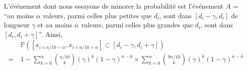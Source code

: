 \begin{itemize}[label=•]



    L'événement dont nous essayons de minorer la probabilité est l'événement \(A\) = ``au moins \(\alpha\) valeurs, parmi celles plus petites que \(d_i\), sont dans \([d_i - \gamma,d_i]\) de longueur \(\gamma\) et au moins \(\alpha\) valeurs, parmi celles plus grandes que \(d_i\), sont dans \([d_i, d_i + \gamma]\)''. Ainsi,
    \begin{align*}
        & \ \mathbb P \left([x_{i\times n/10 -\alpha},x_{i\times n/10 +\alpha}] \subset [d_i - \gamma, d_i + \gamma] \right)\\
        = &\ 1 - \sum_{k = 0}^{\alpha} \binom{n/10}{k}\left( \gamma \right)^k (1 - \gamma)^{n-k} \times \sum_{k = 0}^{\alpha} \binom{9n/10}{k}\left( \gamma \right)^k (1 - \gamma)^{n-k}
    \end{align*}
\end{itemize}


